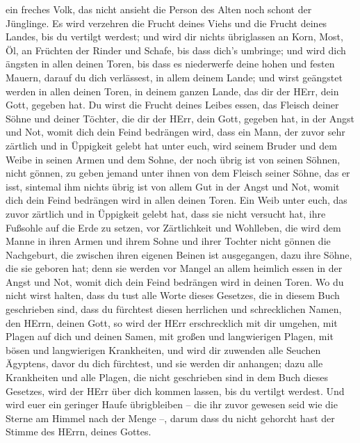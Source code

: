  ein freches Volk, das nicht ansieht die Person des Alten
noch schont der Jünglinge.  Es wird verzehren die Frucht
deines Viehs und die Frucht deines Landes, bis du vertilgt werdest; und
wird dir nichts übriglassen an Korn, Most, Öl, an Früchten der Rinder
und Schafe, bis dass dich's umbringe;  und wird dich
ängsten in allen deinen Toren, bis dass es niederwerfe deine hohen und
festen Mauern, darauf du dich verlässest, in allem deinem Lande; und
wirst geängstet werden in allen deinen Toren, in deinem ganzen Lande,
das dir der HErr, dein Gott, gegeben hat.  Du wirst die
Frucht deines Leibes essen, das Fleisch deiner Söhne und deiner Töchter,
die dir der HErr, dein Gott, gegeben hat, in der Angst und Not, womit
dich dein Feind bedrängen wird,  dass ein Mann, der zuvor
sehr zärtlich und in Üppigkeit gelebt hat unter euch, wird seinem Bruder
und dem Weibe in seinen Armen und dem Sohne, der noch übrig ist von
seinen Söhnen, nicht gönnen,  zu geben jemand unter ihnen
von dem Fleisch seiner Söhne, das er isst, sintemal ihm nichts übrig ist
von allem Gut in der Angst und Not, womit dich dein Feind bedrängen wird
in allen deinen Toren.  Ein Weib unter euch, das zuvor
zärtlich und in Üppigkeit gelebt hat, dass sie nicht versucht hat, ihre
Fußsohle auf die Erde zu setzen, vor Zärtlichkeit und Wohlleben, die
wird dem Manne in ihren Armen und ihrem Sohne und ihrer Tochter nicht
gönnen  die Nachgeburt, die zwischen ihren eigenen Beinen
ist ausgegangen, dazu ihre Söhne, die sie geboren hat; denn sie werden
vor Mangel an allem heimlich essen in der Angst und Not, womit dich dein
Feind bedrängen wird in deinen Toren.  Wo du nicht wirst
halten, dass du tust alle Worte dieses Gesetzes, die in diesem Buch
geschrieben sind, dass du fürchtest diesen herrlichen und schrecklichen
Namen, den HErrn, deinen Gott,  so wird der HErr
erschrecklich mit dir umgehen, mit Plagen auf dich und deinen Samen, mit
großen und langwierigen Plagen, mit bösen und langwierigen Krankheiten,
 und wird dir zuwenden alle Seuchen Ägyptens, davor du dich
fürchtest, und sie werden dir anhangen;  dazu alle
Krankheiten und alle Plagen, die nicht geschrieben sind in dem Buch
dieses Gesetzes, wird der HErr über dich kommen lassen, bis du vertilgt
werdest.  Und wird euer ein geringer Haufe übrigbleiben --
die ihr zuvor gewesen seid wie die Sterne am Himmel nach der Menge --,
darum dass du nicht gehorcht hast der Stimme des HErrn, deines Gottes.
